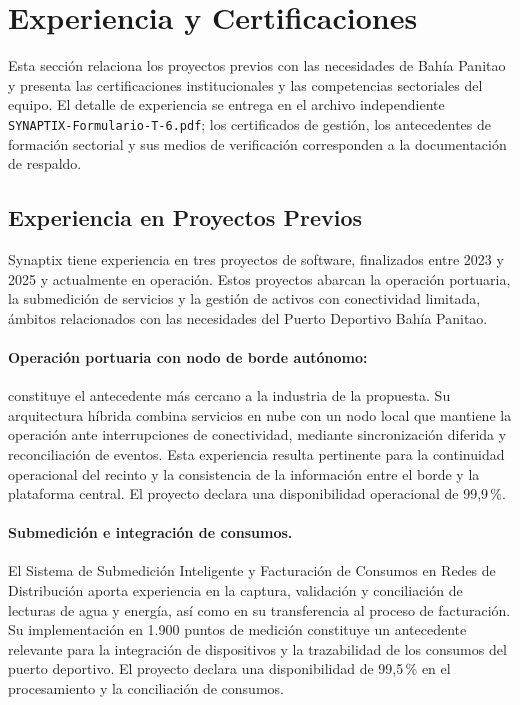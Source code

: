 \section{Experiencia y Certificaciones}

Esta sección relaciona los proyectos previos con las necesidades de Bahía Panitao y presenta las certificaciones institucionales y las competencias sectoriales del equipo. El detalle de experiencia se entrega en el archivo independiente \texttt{SYNAPTIX-Formulario-T-6.pdf}; los certificados de gestión, los antecedentes de formación sectorial y sus medios de verificación corresponden a la documentación de respaldo.

\subsection{Experiencia en Proyectos Previos}



Synaptix tiene experiencia en tres proyectos de software, finalizados entre 2023 y 2025 y actualmente en operación.
Estos proyectos abarcan la operación portuaria, la submedición de
servicios y la gestión de activos con conectividad limitada,
ámbitos relacionados con las necesidades del Puerto Deportivo
Bahía Panitao.

\paragraph{Operación portuaria con nodo de borde autónomo:}
constituye el antecedente más cercano a la industria de la propuesta.
Su arquitectura híbrida combina servicios en nube con un nodo
local que mantiene la operación ante interrupciones de conectividad,
mediante sincronización diferida y reconciliación de eventos.
Esta experiencia resulta pertinente para la continuidad operacional
del recinto y la consistencia de la información entre el borde y
la plataforma central. El proyecto declara una disponibilidad
operacional de 99,9\,\%.

\paragraph{Submedición e integración de consumos.}
El Sistema de Submedición Inteligente y Facturación de Consumos
en Redes de Distribución aporta experiencia en la captura,
validación y conciliación de lecturas de agua y energía, así como
en su transferencia al proceso de facturación. Su implementación
en 1.900 puntos de medición constituye un antecedente relevante
para la integración de dispositivos y la trazabilidad de los
consumos del puerto deportivo. El proyecto declara una
disponibilidad de 99,5\,\% en el procesamiento y la conciliación
de consumos.

